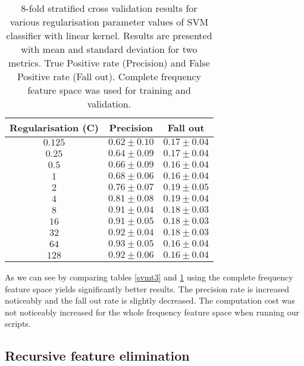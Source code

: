 \documentclass[reqno,openany,12pt]{amsbook}
\begin{document}
\begin{table}
\begin{tabular}{|c|c|c|}
\hline
Regularisation (C) &  Precision & Fall out \\ \hline 
$0.125$ &  $0.62 \pm 0.10$ & $0.17 \pm 0.04$ \\ \hline 
$0.25$ &  $0.64 \pm 0.09$ & $0.17 \pm 0.04$ \\ \hline 
$0.5$ &  $0.66 \pm 0.09$ & $0.16 \pm 0.04$ \\ \hline 
$1$ &  $0.68 \pm 0.06$ & $0.16 \pm 0.04$ \\ \hline 
$2$ &  $0.76 \pm 0.07$ & $0.19 \pm 0.05$ \\ \hline 
$4$ &  $0.81 \pm 0.08$ & $0.19 \pm 0.04$ \\ \hline 
$8$ &  $0.91 \pm 0.04$ & $0.18 \pm 0.03$ \\ \hline 
$16$ &  $0.91 \pm 0.05$ & $0.18 \pm 0.03$ \\ \hline 
$32$ &  $0.92 \pm 0.04$ & $0.18 \pm 0.03$ \\ \hline
$64$ &  $0.93 \pm 0.05$ & $0.16 \pm 0.04$ \\ \hline
$128$ &  $0.92 \pm 0.06$ & $0.16 \pm 0.04$ \\ \hline
\end{tabular}
\vspace{5pt}
\caption[Cross Validation and Linear SVM regularisation on complete frequency feature space.]{8-fold stratified cross validation results for various regularisation parameter values of SVM classifier with linear kernel. Results are presented with mean and standard deviation for two metrics. True Positive rate (Precision) and False Positive rate (Fall out). Complete frequency feature space was used for training and validation.}
\label{svmt4}
\end{table}

As we can see by comparing tables \ref{svmt3} and \ref{svmt4} using the complete frequency feature space yields significantly better results. The precision rate is increased noticeably and the fall out rate is slightly decreased. The computation cost was not noticeably increased for the whole frequency feature space when running our scripts.

\subsection{Recursive feature elimination}\mbox{}
\end{document}
